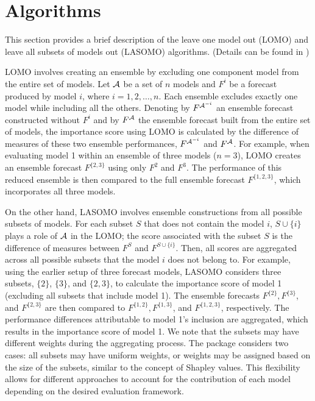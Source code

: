 \documentclass[
  article,
  shortnames,
  notitle]{jss}
\begin{document}
\section{Algorithms}\label{algorithms}

This section provides a brief description of the leave one model out
(LOMO) and leave all subsets of models out (LASOMO) algorithms. (Details
can be found in \citep{kim2024})

LOMO involves creating an ensemble by excluding one component model from
the entire set of models. Let \({\cal A}\) be a set of \(n\) models and
\(F^i\) be a forecast produced by model \(i\), where
\(i = 1,2, \dots, n.\) Each ensemble excludes exactly one model while
including all the others. Denoting by \(F^{{\cal A}^{-i}}\) an ensemble
forecast constructed without \(F^i\) and by \(F^{\cal A}\) the ensemble
forecast built from the entire set of models, the importance score using
LOMO is calculated by the difference of measures of these two ensemble
performances, \(F^{{\cal A}^{-i}}\) and \(F^{\cal A}\). For example,
when evaluating model 1 within an ensemble of three models (\(n=3\)),
LOMO creates an ensemble forecast \(F^{\{2,3\}}\) using only \(F^2\) and
\(F^3\). The performance of this reduced ensemble is then compared to
the full ensemble forecast \(F^{\{1,2,3\}}\), which incorporates all
three models.

On the other hand, LASOMO involves ensemble constructions from all
possible subsets of models. For each subset \(S\) that does not contain
the model \(i\), \(S \cup \{i\}\) plays a role of \({\cal A}\) in the
LOMO; the score associated with the subset \(S\) is the difference of
measures between \(F^S\) and \(F^{S \cup \{i\}}\). Then, all scores are
aggregated across all possible subsets that the model \(i\) does not
belong to. For example, using the earlier setup of three forecast
models, LASOMO considers three subsets, \(\{2\}\), \(\{3\}\), and
\(\{2, 3\}\), to calculate the importance score of model 1 (excluding
all subsets that include model 1). The ensemble forecasts
\(F^{\{2\}}, F^{\{3\}}\), and \(F^{\{2,3\}}\) are then compared to
\(F^{\{1,2\}}, F^{\{1,3\}}\), and \(F^{\{1,2,3\}}\), respectively. The
performance differences attributable to model 1's inclusion are
aggregated, which results in the importance score of model 1. We note
that the subsets may have different weights during the aggregating
process. The  package considers two cases: all
subsets may have uniform weights, or weights may be assigned based on
the size of the subsets, similar to the concept of Shapley values. This
flexibility allows for different approaches to account for the
contribution of each model depending on the desired evaluation
framework.
\end{document}
